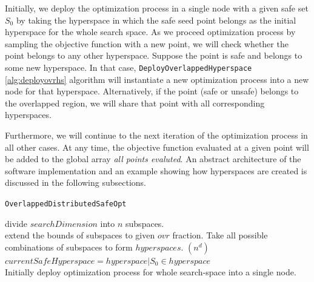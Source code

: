 Initially, we deploy the optimization process in a single node with a given safe set $S_0$ by taking the hyperspace in which the safe seed point belongs as the initial hyperspace for the whole search space. As we proceed optimization process by sampling the objective function with a new point, we will check whether the point belongs to any other hyperspace. 
Suppose the point is safe and belongs to some new hyperspace. In that case, \texttt{DeployOverlappedHyperspace} \ref{alg:deployovrhs} algorithm will instantiate a new optimization process into a new node for that hyperspace. Alternatively, if the point (safe or unsafe) belongs to the overlapped region, we will share that point with all corresponding hyperspaces.

Furthermore, we will continue to the next iteration of the optimization process in all other cases. At any time, the objective function evaluated at a given point will be added to the global array \textit{all points evaluted}. An abstract architecture of the software implementation and an example showing how hyperspaces are created is discussed in the following subsections.\\


\begin{algorithm}[H]
	\caption{\texttt{OverlappedDistributedSafeOpt}}
	\label{alg:ovrdsbo}
	{
		divide $searchDimension$ into $n$ subspaces.\\
		extend the bounds of subspaces to given $ovr$ fraction.
	}
	Take all possible combinations of subspaces to form $hyperspaces$. $(n^d)$\\
	$currentSafeHyperspace = hyperspace | S_0 \in hyperspace$\\
	Initially deploy optimization process for whole search-space into a single node.\\		
\end{algorithm}

